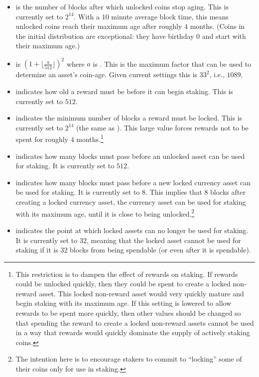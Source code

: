 \begin{itemize}
\item {} is the number of blocks after which unlocked coins
stop aging. This is currently set to $2^{14}$. With a 10 minute average block time,
this means unlocked coins reach their maximum age after roughly $4$ months.
(Coins in the initial distribution are exceptional: they have birthday $0$ and start with their maximum age.)
\item {} is $(1+\lfloor \frac{a}{512}\rfloor)^2$ where $a$ is {}.
This is the maximum factor that can be used to determine an asset's coin-age.
Given current settings this is $33^2$, i.e., $1089$.
\item {} indicates how old a reward must be before it can begin staking. This is currently set to $512$.
\item {} indicates the minimum number of blocks a reward must be locked.
This is currently set to $2^{14}$ (the same as {}).
This large value forces rewards not to be spent for roughly $4$ months.\footnote{This restriction is to dampen the effect
of rewards on staking. If rewards could be unlocked quickly, then they could be
spent to create a locked non-reward asset. This locked non-reward asset would
very quickly mature and begin staking with its maximum age.
If this setting is lowered to allow rewards to be spent more quickly,
then other values should be changed so that spending the reward to create
a locked non-reward assets cannot be used in a
way that rewards would quickly dominate the supply of actively staking coins.}
\item {} indicates how many blocks must pass before
an unlocked asset can be used for staking. It is currently set to $512$.
\item {} indicates how many blocks must pass before
a new locked currency asset can be used for staking.
It is currently set to $8$. This implies that $8$ blocks after creating a locked
currency asset, the currency asset can be used for staking with its maximum age,
until it is close to being unlocked.\footnote{The intention here is to encourage
stakers to commit to ``locking'' some of their coins only for use in staking.}
\item {} indicates the point at which locked assets can
no longer be used for staking. It is currently set to $32$, meaning that
the locked asset cannot be used for staking if it is $32$ blocks from being spendable
(or even after it is spendable).
\end{itemize}

